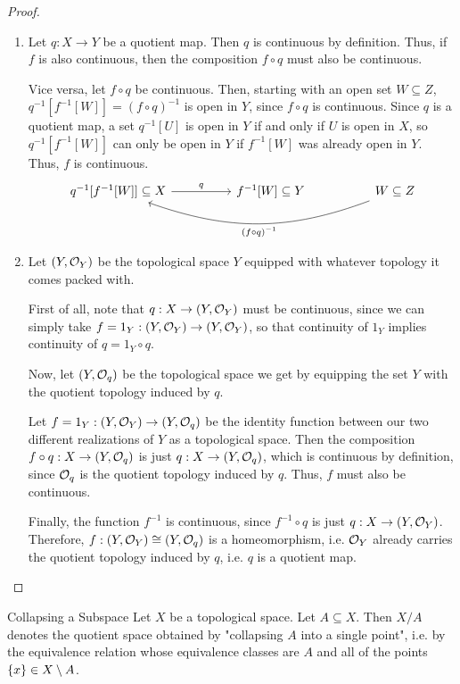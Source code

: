 \begin{proof}
	\begin{enumerate}
		\item[$\Rightarrow:$] Let $q : X \to Y$ be a quotient map. Then $q$ is continuous by definition. Thus, if $f$ is also continuous, then the composition $f \circ q$ must also be continuous.

		Vice versa, let $f \circ q$ be continuous. Then, starting with an open set $W \subseteq Z$, $q^{-1}[f^{-1}[W]] = (f \circ q)^{-1}$ is open in $Y$, since $f \circ q$ is continuous. Since $q$ is a quotient map, a set $q^{-1}[U]$ is open in $Y$ if and only if $U$ is open in $X$, so $q^{-1}[f^{-1}[W]]$ can only be open in $Y$ if $f^{-1}[W]$ was already open in $Y$. Thus, $f$ is continuous.
		\[\begin{tikzcd}
			{q^{-1}[f^{-1}[W]] \subseteq X} && {f^{-1}[W] \subseteq Y} && W \subseteq Z
			\arrow["q", from=1-1, to=1-3]
			\arrow["{(f \circ q)^{-1}}", bend left=20, from=1-5, to=1-1]
		\end{tikzcd}\]
		\item[$\Leftarrow:$] Let $(Y, \mathcal{O}_Y)$ be the topological space $Y$ equipped with whatever topology it comes packed with. 
		
		First of all, note that $q : X \to (Y, \mathcal{O}_Y)$ must be continuous, since we can simply take $f = 1_Y : (Y, \mathcal{O}_Y) \to (Y, \mathcal{O}_Y)$, so that continuity of $1_Y$ implies continuity of $q = 1_Y \circ q$.
		
		Now, let $(Y, \mathcal{O}_q)$ be the topological space we get by equipping the set $Y$ with the quotient topology induced by $q$. 
		
		Let $f = 1_Y : (Y, \mathcal{O}_Y) \to (Y, \mathcal{O}_q)$ be the identity function between our two different realizations of $Y$ as a topological space. Then the composition $f \circ q : X \to (Y, \mathcal{O}_q)$ is just $q : X \to (Y, \mathcal{O}_q)$, which is continuous by definition, since $\mathcal{O}_q$ is the quotient topology induced by $q$. Thus, $f$ must also be continuous.
		
		Finally, the function $f^{-1}$ is continuous, since $f^{-1} \circ q$ is just $q : X \to (Y, \mathcal{O}_Y)$. Therefore, $f : (Y, \mathcal{O}_Y) \cong (Y, \mathcal{O}_q)$ is a homeomorphism, i.e. $\mathcal{O}_Y$ already carries the quotient topology induced by $q$, i.e. $q$ is a quotient map.
	\end{enumerate}
\end{proof}
\begin{importantdefinition}{Collapsing a Subspace}{}
	Let $X$ be a topological space. Let $A \subseteq X$. Then $X/A$ denotes the quotient space obtained by "collapsing $A$ into a single point", i.e. by the equivalence relation whose equivalence classes are $A$ and all of the points $\qty{x} \in X \setminus A$.
\end{importantdefinition}
